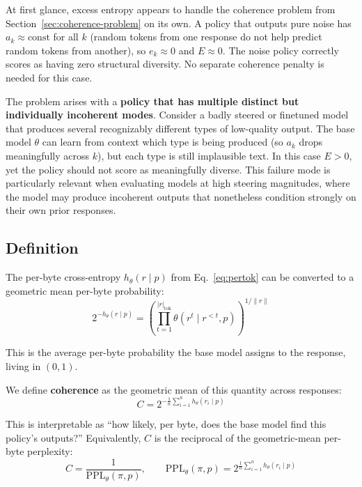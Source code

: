 \documentclass[11pt]{article}
\begin{document}
At first glance, excess entropy appears to handle the coherence problem from Section~\ref{sec:coherence-problem} on its own. A policy that outputs pure noise has $a_k \approx \mathrm{const}$ for all $k$ (random tokens from one response do not help predict random tokens from another), so $e_k \approx 0$ and $E \approx 0$. The noise policy correctly scores as having zero structural diversity. No separate coherence penalty is needed for this case.

The problem arises with a \textbf{policy that has multiple distinct but individually incoherent modes}. Consider a badly steered or finetuned model that produces several recognizably different types of low-quality output. The base model $\theta$ can learn from context which type is being produced (so $a_k$ drops meaningfully across $k$), but each type is still implausible text. In this case $E > 0$, yet the policy should not score as meaningfully diverse. This failure mode is particularly relevant when evaluating models at high steering magnitudes, where the model may produce incoherent outputs that nonetheless condition strongly on their own prior responses.

\subsection{Definition}

The per-byte cross-entropy $h_\theta(r \mid p)$ from Eq.~\eqref{eq:pertok} can be converted to a geometric mean per-byte probability:
\begin{equation}
    2^{-h_\theta(r \mid p)} = \left(\prod_{t=1}^{|r|_{\mathrm{tok}}} \theta(r^t \mid r^{<t}, p)\right)^{1/\|r\|}
\end{equation}

This is the average per-byte probability the base model assigns to the response, living in $(0,1)$.

We define \textbf{coherence} as the geometric mean of this quantity across responses:
\begin{equation}\label{eq:coherence}
    C = 2^{-\frac{1}{n}\sum_{i=1}^{n} h_\theta(r_i \mid p)}
\end{equation}

This is interpretable as ``how likely, per byte, does the base model find this policy's outputs?'' Equivalently, $C$ is the reciprocal of the geometric-mean per-byte perplexity:
\begin{equation}
    C = \frac{1}{\mathrm{PPL}_\theta(\pi, p)}, \qquad \mathrm{PPL}_\theta(\pi, p) = 2^{\frac{1}{n}\sum_{i=1}^{n} h_\theta(r_i \mid p)}
\end{equation}
\end{document}
